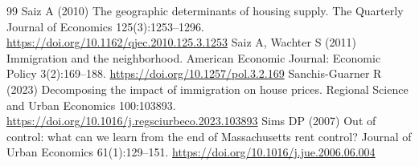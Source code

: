 \begin{thebibliography}{99}
 Saiz A (2010) The geographic determinants of housing supply. The Quarterly Journal of Economics 125(3):1253--1296. \url{https://doi.org/10.1162/qjec.2010.125.3.1253}
 Saiz A, Wachter S (2011) Immigration and the neighborhood. American Economic Journal: Economic Policy 3(2):169--188. \url{https://doi.org/10.1257/pol.3.2.169}
 Sanchis-Guarner R (2023) Decomposing the impact of immigration on house prices. Regional Science and Urban Economics 100:103893. \url{https://doi.org/10.1016/j.regsciurbeco.2023.103893}
 Sims DP (2007) Out of control: what can we learn from the end of Massachusetts rent control? Journal of Urban Economics 61(1):129--151. \url{https://doi.org/10.1016/j.jue.2006.06.004}
\end{thebibliography}
